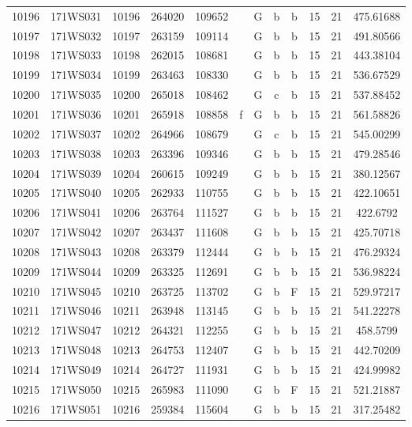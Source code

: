 \begin{tabular}{|*{12}{c|}}
10196 & 171WS031 & 10196 & 264020 & 109652 &  & G & b & b & 15 & 21 & 475.61688 \\ 
10197 & 171WS032 & 10197 & 263159 & 109114 &  & G & b & b & 15 & 21 & 491.80566 \\ 
10198 & 171WS033 & 10198 & 262015 & 108681 &  & G & b & b & 15 & 21 & 443.38104 \\ 
10199 & 171WS034 & 10199 & 263463 & 108330 &  & G & b & b & 15 & 21 & 536.67529 \\ 
10200 & 171WS035 & 10200 & 265018 & 108462 &  & G & c & b & 15 & 21 & 537.88452 \\ 
10201 & 171WS036 & 10201 & 265918 & 108858 & f & G & b & b & 15 & 21 & 561.58826 \\ 
10202 & 171WS037 & 10202 & 264966 & 108679 &  & G & c & b & 15 & 21 & 545.00299 \\ 
10203 & 171WS038 & 10203 & 263396 & 109346 &  & G & b & b & 15 & 21 & 479.28546 \\ 
10204 & 171WS039 & 10204 & 260615 & 109249 &  & G & b & b & 15 & 21 & 380.12567 \\ 
10205 & 171WS040 & 10205 & 262933 & 110755 &  & G & b & b & 15 & 21 & 422.10651 \\ 
10206 & 171WS041 & 10206 & 263764 & 111527 &  & G & b & b & 15 & 21 & 422.6792 \\ 
10207 & 171WS042 & 10207 & 263437 & 111608 &  & G & b & b & 15 & 21 & 425.70718 \\ 
10208 & 171WS043 & 10208 & 263379 & 112444 &  & G & b & b & 15 & 21 & 476.29324 \\ 
10209 & 171WS044 & 10209 & 263325 & 112691 &  & G & b & b & 15 & 21 & 536.98224 \\ 
10210 & 171WS045 & 10210 & 263725 & 113702 &  & G & b & F & 15 & 21 & 529.97217 \\ 
10211 & 171WS046 & 10211 & 263948 & 113145 &  & G & b & b & 15 & 21 & 541.22278 \\ 
10212 & 171WS047 & 10212 & 264321 & 112255 &  & G & b & b & 15 & 21 & 458.5799 \\ 
10213 & 171WS048 & 10213 & 264753 & 112407 &  & G & b & b & 15 & 21 & 442.70209 \\ 
10214 & 171WS049 & 10214 & 264727 & 111931 &  & G & b & b & 15 & 21 & 424.99982 \\ 
10215 & 171WS050 & 10215 & 265983 & 111090 &  & G & b & F & 15 & 21 & 521.21887 \\ 
10216 & 171WS051 & 10216 & 259384 & 115604 &  & G & b & b & 15 & 21 & 317.25482 \\ 

\end{tabular}

